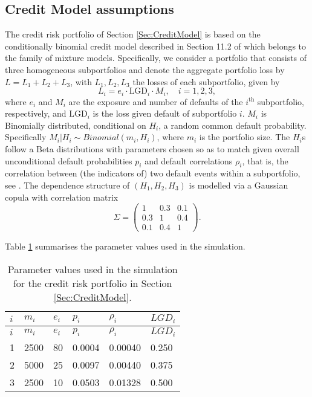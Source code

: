 \documentclass[
]{article}
\begin{document}
\hypertarget{credit-model-assumptions}{%
\subsection{Credit Model assumptions}\label{credit-model-assumptions}}

The credit risk portfolio of Section \ref{Sec:CreditModel} is based on the conditionally binomial credit model described in Section 11.2 of \citet{Mcneil2015B} which belongs to the family of mixture models. Specifically, we consider a portfolio that consists of three homogeneous subportfolios and denote the aggregate portfolio loss by \(L = L_1 + L_2+ L_3\), with \(L_1, L_2, L_3\) the losses of each subportfolio, given by
\begin{equation}
L_i=e_i\cdot\text{LGD}_i\cdot M_i,\quad i=1,2,3, 
\end{equation}
where \(e_i\) and \(M_i\) are the exposure and number of defaults of the \(i^{\text{th}}\) subportfolio, respectively, and \(\text{LGD}_i\) is the loss given default of subportfolio \(i\). \(M_i\) is Binomially distributed, conditional on \(H_i\), a random common default probability. Specifically \(M_i|H_i \sim Binomial(m_i,H_i)\), where \(m_i\) is the portfolio size. The \(H_i\)s follow a Beta distributions with parameters chosen so as to match given overall unconditional default probabilities \(p_i\) and default correlations \(\rho_i\), that is, the correlation between (the indicators of) two default events within a subportfolio, see \citet{Mcneil2015B}. The dependence structure of \((H_1,H_2,H_3)\) is modelled via a Gaussian copula with correlation matrix\\
\begin{equation}\Sigma = \begin{pmatrix}
1 & 0.3 & 0.1\\
0.3 & 1 & 0.4\\
0.1 & 0.4 & 1
\end{pmatrix}.\end{equation}

Table \ref{tab:credit} summarises the parameter values used in the simulation.

\begin{longtable}[]{@{}llllll@{}}
\caption{\label{tab:credit} Parameter values used in the simulation for the credit risk portfolio in Section \ref{Sec:CreditModel}.}\tabularnewline
\toprule
\(i\) & \(m_i\) & \(e_i\) & \(p_i\) & \(\rho_i\) & \(LGD_i\)\tabularnewline
\midrule
\endfirsthead
\toprule
\(i\) & \(m_i\) & \(e_i\) & \(p_i\) & \(\rho_i\) & \(LGD_i\)\tabularnewline
\midrule
\endhead
1 & 2500 & 80 & 0.0004 & 0.00040 & 0.250\tabularnewline
2 & 5000 & 25 & 0.0097 & 0.00440 & 0.375\tabularnewline
3 & 2500 & 10 & 0.0503 & 0.01328 & 0.500\tabularnewline
\bottomrule
\end{longtable}
\end{document}
